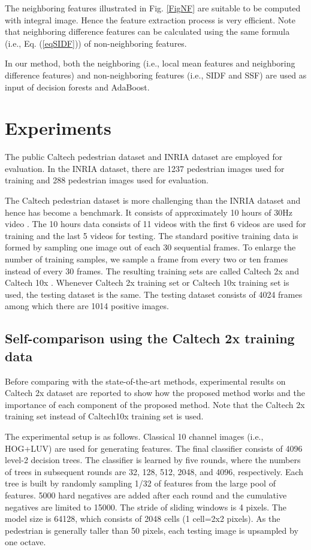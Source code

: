 \documentclass[10pt,twocolumn,letterpaper]{article}
\begin{document}
The neighboring features illustrated in Fig. \ref{FigNF} are suitable to be computed 
with integral image. Hence the feature extraction process is very efficient. 
Note that neighboring difference features can be calculated using the same 
formula (i.e., Eq. (\ref{eqSIDF})) of non-neighboring features.

In our method, both the neighboring (i.e., local mean features and 
neighboring difference features) and non-neighboring features (i.e., SIDF and SSF) are used as input of decision forests and AdaBoost.

\section{Experiments}
The public Caltech pedestrian dataset \cite{Caltech,Dollar_PD_PAMI_2012} and 
INRIA dataset \cite{Dalal_HOG_CVPR_2005} are employed for evaluation. In 
the INRIA dataset, there are 1237 pedestrian images used for training and 
288 pedestrian images used for evaluation.

The Caltech pedestrian dataset is more challenging than the INRIA dataset 
and hence has become a benchmark. It consists of approximately 10 hours of 
 30Hz video \cite{Caltech}. The 10 hours data consists of 11 
videos with the first 6 videos are used for training and the last 5 videos 
for testing. The standard 
positive training data is formed by sampling one image out of each 30 
sequential frames. To enlarge the number of training samples, we sample a frame from every two 
or ten frames instead of every 30 frames. The resulting 
training sets are called Caltech 2x and Caltech 10x \cite{Zhang_FCF_CVPR_2015}. Whenever Caltech 2x training set or Caltech 10x training set is used, the testing dataset is the same. The testing dataset consists of 4024 frames among which there are 1014 positive images. 


\subsection{Self-comparison using the Caltech 2x training data }

Before comparing with the state-of-the-art methods, experimental results on 
Caltech 2x dataset are reported to show how the proposed method works and 
the importance of each component of the proposed method. Note that the 
Caltech 2x training set instead of Caltech10x training set is used. 

The experimental setup is as follows. Classical 10 channel images (i.e., 
HOG+LUV) are used for generating features. The final classifier consists of 
4096 level-2 decision trees. The classifier is learned by five rounds, where 
the numbers of trees in subsequent rounds are 32, 128, 512, 2048, and 4096, 
respectively. Each tree is built by randomly sampling 1/32 of features from 
the large pool of features. 5000 hard negatives are added after each round 
and the cumulative negatives are limited to 15000. The stride of sliding 
windows is 4 pixels. The model size is 64128, which consists of 
2048 cells (1 cell=2x2 pixels). As the pedestrian is generally taller than 50 
pixels, each testing image is upsampled by one octave. 
\end{document}

